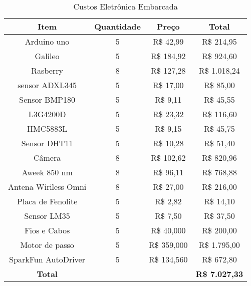 \begin{table}[]
\centering
\caption{Custos Eletrônica Embarcada}
\label{tab:custosEletronica}
\begin{tabular}{|c|c|c|c|}
\hline
\rowcolor[HTML]{FFFFFF} 
{\color[HTML]{000000} \textbf{Item}} & \textbf{Quantidade} & \textbf{Preço} & \textbf{Total}        \\ \hline
Arduino uno                          & 5                   & R\$ 42,99      & R\$ 214,95            \\ \hline
Galileo                              & 5                   & R\$ 184,92     & R\$ 924,60            \\ \hline
Rasberry                             & 8                   & R\$ 127,28     & R\$ 1.018,24          \\ \hline
sensor ADXL345                       & 5                   & R\$ 17,00      & R\$ 85,00             \\ \hline
Sensor BMP180                        & 5                   & R\$ 9,11       & R\$ 45,55             \\ \hline
L3G4200D                             & 5                   & R\$ 23,32      & R\$ 116,60            \\ \hline
HMC5883L                             & 5                   & R\$ 9,15       & R\$ 45,75             \\ \hline
Sensor DHT11                         & 5                   & R\$ 10,28      & R\$ 51,40             \\ \hline
Câmera                               & 8                   & R\$ 102,62     & R\$ 820,96            \\ \hline
Aweek 850 nm                         & 8                   & R\$ 96,11      & R\$ 768,88            \\ \hline
Antena Wiriless Omni                 & 8                   & R\$ 27,00      & R\$ 216,00            \\ \hline
Placa de Fenolite                    & 5                   & R\$ 2,82       & R\$ 14,10             \\ \hline
Sensor LM35                          & 5                   & R\$ 7,50       & R\$ 37,50             \\ \hline
Fios e Cabos                         & 5                   & R\$ 40,000     & R\$ 200,00            \\ \hline
Motor de passo                       & 5                   & R\$ 359,000    & R\$ 1.795,00          \\ \hline
SparkFun AutoDriver                  & 5                   & R\$ 134,560    & R\$ 672,80            \\ \hline
\rowcolor[HTML]{C0C0C0} 
\textbf{Total}                       &                     &                & \textbf{R\$ 7.027,33} \\ \hline
\end{tabular}
\end{table}


